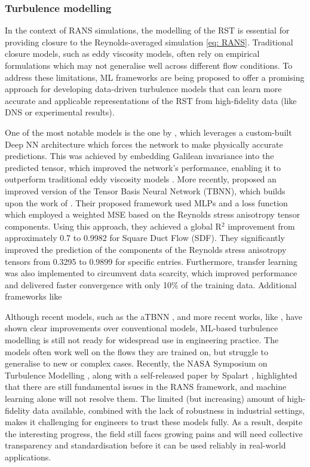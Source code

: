 \subsubsection{Turbulence modelling}
In the context of RANS simulations, the modelling of the RST is essential for providing closure to the Reynolds-averaged simulation \ref{eq: RANS}. Traditional closure models, such as eddy viscosity models, often rely on empirical formulations which may not generalise well across different flow conditions. To address these limitations, ML frameworks are being proposed to offer a promising approach for developing data-driven turbulence models that can learn more accurate and applicable representations of the RST from high-fidelity data (like DNS or experimental results). 

One of the most notable models is the one by \textcite{Ling2016}, which leverages a custom-built Deep NN architecture which forces the network to make physically accurate predictions. This was achieved by embedding Galilean invariance into the predicted tensor, which improved the network's performance, enabling it to outperform traditional eddy viscosity models \cite{Vinuesa2022}. More recently, \textcite{Cai2024} proposed an improved version of the Tensor Basis Neural Network (TBNN), which builds upon the work of \textcite{Ling2016}. Their proposed framework used MLPs and a loss function which employed a weighted MSE based on the Reynolds stress anisotropy tensor components. Using this approach, they achieved a global R$^2$ improvement from approximately 0.7 to 0.9982 for Square Duct Flow (SDF). They significantly improved the prediction of the components of the Reynolds stress anisotropy tensors from 0.3295 to 0.9899 for specific entries. Furthermore, transfer learning was also implemented to circumvent data scarcity, which improved performance and delivered faster convergence with only 10\% of the training data. Additional frameworks like 

Although recent models, such as the aTBNN \cite{Cai2024}, and more recent works, like \cite{Girimaji2024, Jiang2021, Sanhueza2023}, have shown clear improvements over conventional models, ML-based turbulence modelling is still not ready for widespread use in engineering practice. The models often work well on the flows they are trained on, but struggle to generalise to new or complex cases. Recently, the NASA Symposium on Turbulence Modelling \cite{Rumsey2022}, along with a self-released paper by Spalart \cite{Spalart}, highlighted that there are still fundamental issues in the RANS framework, and machine learning alone will not resolve them. The limited (but increasing) amount of high-fidelity data available, combined with the lack of robustness in industrial settings, makes it challenging for engineers to trust these models fully. As a result, despite the interesting progress, the field still faces growing pains and will need collective transparency and standardisation before it can be used reliably in real-world applications. 


